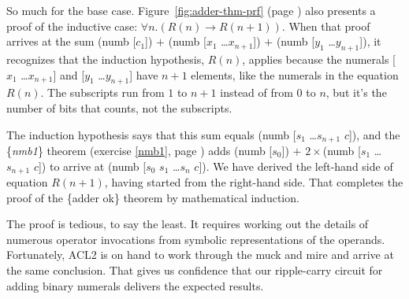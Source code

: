 So much for the base case.
Figure~\ref{fig:adder-thm-prf} (page \pageref{fig:adder-thm-prf}) also presents
a proof of the inductive case: $\forall n.(R(n) \rightarrow R(n+1))$.
When that proof arrives at the sum
\textsf{(numb [$c_1$])} $+$ \textsf{(numb [$x_1$ \dots $x_{n+1}$])} $+$ \textsf{(numb [$y_1$ \dots $y_{n+1}$])},
it recognizes that the induction hypothesis, $R(n)$, applies because
the numerals \textsf{[$x_1$ \dots $x_{n+1}$]} and \textsf{[$y_1$ \dots $y_{n+1}$]} have $n+1$
elements, like the numerals in the equation $R(n)$.
The subscripts run from $1$ to $n+1$ instead of from $0$ to $n$,
but it's the number of bits that counts, not the subscripts.

The induction hypothesis says that this sum equals
\textsf{(numb [$s_1$ \dots $s_{n+1}$ $c$])}, and
the \{\emph{nmb1}\} theorem (exercise \ref{nmb1}, page \pageref{nmb1})
adds \textsf{(numb [$s_0$])} $+$ $2\times$\textsf{(numb [$s_1$ \dots $s_{n+1}$ $c$])}
to arrive at \textsf{(numb [$s_0$ $s_1$ \dots $s_{n}$ $c$])}.
We have derived the left-hand side
of equation $R(n+1)$, having started from the right-hand side.
That completes the proof of the \{adder ok\} theorem
by mathematical induction.

The proof is tedious, to say the least.
It requires working out the details of
numerous operator invocations
from symbolic representations of the operands.
Fortunately, ACL2 is on hand to work through the
muck and mire and arrive at the same conclusion.
That gives us confidence that our ripple-carry circuit
for adding binary numerals delivers the expected results.

